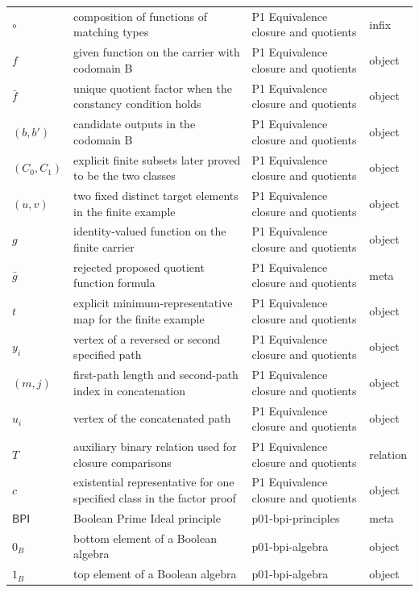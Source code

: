 \begin{longtable}{@{}p{}p{}p{}p{}@{}}
\(\circ\) & composition of functions of matching types & P1 Equivalence closure and quotients & infix \\
\(f\) & given function on the carrier with codomain B & P1 Equivalence closure and quotients & object \\
\(\bar f\) & unique quotient factor when the constancy condition holds & P1 Equivalence closure and quotients & object \\
\((b,\allowbreak b')\) & candidate outputs in the codomain B & P1 Equivalence closure and quotients & object \\
\((C_0,\allowbreak C_1)\) & explicit finite subsets later proved to be the two classes & P1 Equivalence closure and quotients & object \\
\((u,\allowbreak v)\) & two fixed distinct target elements in the finite example & P1 Equivalence closure and quotients & object \\
\(g\) & identity-valued function on the finite carrier & P1 Equivalence closure and quotients & object \\
\(\bar g\) & rejected proposed quotient function formula & P1 Equivalence closure and quotients & meta \\
\(t\) & explicit minimum-representative map for the finite example & P1 Equivalence closure and quotients & object \\
\(y_i\) & vertex of a reversed or second specified path & P1 Equivalence closure and quotients & object \\
\((m,\allowbreak j)\) & first-path length and second-path index in concatenation & P1 Equivalence closure and quotients & object \\
\(u_i\) & vertex of the concatenated path & P1 Equivalence closure and quotients & object \\
\(T\) & auxiliary binary relation used for closure comparisons & P1 Equivalence closure and quotients & relation \\
\(c\) & existential representative for one specified class in the factor proof & P1 Equivalence closure and quotients & object \\
\(\mathsf{BPI}\) & Boolean Prime Ideal principle & p01-\allowbreak{}bpi-\allowbreak{}principles & meta \\
\(0_B\) & bottom element of a Boolean algebra & p01-\allowbreak{}bpi-\allowbreak{}algebra & object \\
\(1_B\) & top element of a Boolean algebra & p01-\allowbreak{}bpi-\allowbreak{}algebra & object \\

\end{longtable}
